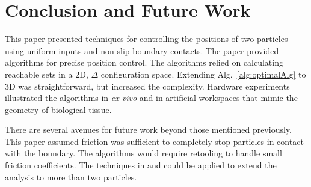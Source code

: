 \section{Conclusion and Future Work}\label{sec:conclusion}

This paper presented techniques for controlling the positions of two particles using uniform inputs and non-slip boundary contacts.  
The paper provided algorithms for precise position control. The algorithms relied on calculating reachable sets in a 2D, $\Delta$ configuration space.
Extending Alg.~\ref{alg:optimalAlg}  to 3D was straightforward, but increased the complexity.
Hardware experiments illustrated the algorithms in \emph{ex vivo} and in artificial workspaces that mimic the geometry of biological tissue.

There are several avenues for future work beyond those mentioned previously. This paper assumed friction was sufficient to completely stop particles in contact with the boundary. 
  The algorithms would require retooling to handle small friction coefficients. The techniques in \cite{shahrokhi2017algorithms} and  \cite{AaronManipulation2013} could be applied to extend the analysis to more than two particles.
  
